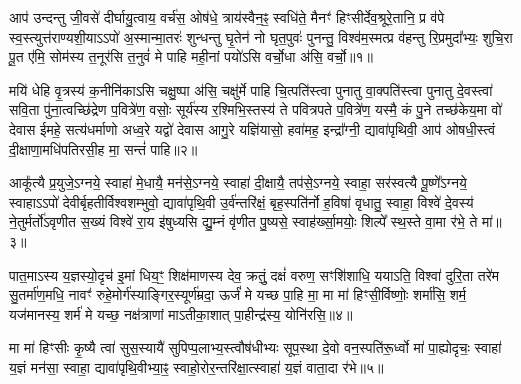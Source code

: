 {\anuvakamend[{जु॒षेथा॒मा स नो॑ यजा॒दा त्रयो॑विꣳशतिश्च}]}

{\prashnaend[{इ॒षे त्वा॑ य॒ज्ञस्य॒ शुन्ध॑ध्वं॒ कर्म॑णे दे॒वो\-ऽव॑धूत॒न्धृष्टिः॒ सं व॑पा॒म्या द॑दे॒
प्रत्यु॑ष्टं॒ कृष्णो॑\-ऽसि॒ भुव॑नमसि॒ वाज॑स्यो॒भा वां॒ चतु॑र्दश॥14॥ इ॒षे दृꣳ॑ह॒ भुव॑नम॒ष्टाविꣳ॑शतिः॥28॥ इ॒षे त्वा॑ क॒ल्पया॑ति॥}]}


\setcounter{anuvakam}{0}
आप॑ उन्दन्तु जी॒वसे॑ दीर्घायु॒त्वाय॒ वर्च॑स॒ ओष॑धे॒ त्राय॑स्वैन॒ꣴ॒ स्वधि॑ते॒ मैनꣳ॑ हिꣳसीर्देव॒श्रूरे॒तानि॒ प्र व॑पे स्व॒स्त्युत्त॑राण्यशी॒या\-ऽ\-ऽपो॑ अ॒स्मान्मा॒तरः॑ शुन्धन्तु घृ॒तेन॑ नो घृत॒पुवः॑ पुनन्तु॒ विश्व॑म॒स्मत्प्र व॑हन्तु रि॒प्रमुदा᳚भ्यः॒ शुचि॒रा पू॒त ए॑मि॒ सोम॑स्य त॒नूर॑सि त॒नुवं॑ मे पाहि मही॒नां पयो॑\-ऽसि वर्चो॒धा अ॑सि॒ वर्चो॒॥१॥

मयि॑ धेहि वृ॒त्रस्य॑ क॒नीनि॑का\-ऽसि चक्षु॒ष्पा अ॑सि॒ चक्षु॑र्मे पाहि चि॒त्पति॑स्त्वा पुनातु वा॒क्पति॑स्त्वा पुनातु दे॒वस्त्वा॑ सवि॒ता पु॑ना॒त्वच्छि॑द्रेण प॒वित्रे॑ण॒ वसोः॒ सूर्य॑स्य र॒श्मिभि॒स्तस्य॑ ते पवित्रपते प॒वित्रे॑ण॒ यस्मै॒ कं पु॒ने तच्छ॑केय॒मा वो॑ देवास ईमहे॒ सत्य॑धर्माणो अध्व॒रे यद्वो॑ देवास आगु॒रे यज्ञि॑यासो॒ हवा॑मह॒ इन्द्रा᳚ग्नी॒ द्यावा॑पृथिवी॒ आप॑ ओषधी॒स्त्वं दी॒क्षाणा॒मधि॑पतिरसी॒ह मा॒ सन्तं॑ पाहि॥२॥

{\anuvakamend[{वर्च॑ ओषधीर॒ष्टौ च॑॥१॥}]}

आकू᳚त्यै प्र॒युजे॒\-ऽग्नये॒ स्वाहा॑ मे॒धायै॒ मन॑से॒\-ऽग्नये॒ स्वाहा॑ दी॒क्षायै॒ तप॑से॒\-ऽग्नये॒ स्वाहा॒ सर॑स्वत्यै पू॒ष्णे᳚\-ऽग्नये॒ स्वाहा\-ऽ\-ऽपो॑ देवीर्बृहतीर्विश्वशम्भुवो॒ द्यावा॑पृथि॒वी उ॒र्व॑न्तरि॑क्षं॒ बृह॒स्पति॑र्नो ह॒विषा॑ वृधातु॒ स्वाहा॒ विश्वे॑ दे॒वस्य॑ ने॒तुर्मर्तो॑\-ऽवृणीत स॒ख्यं विश्वे॑ रा॒य इ॑षुध्यसि द्यु॒म्नं वृ॑णीत पु॒ष्यसे॒ स्वाह॑र्ख्सा॒मयोः॒ शिल्पे᳚ स्थ॒स्ते वा॒मा र॑भे॒ ते मा॑॥३॥

पात॒मा\-ऽस्य य॒ज्ञस्यो॒दृच॑ इ॒मां धिय॒ꣳ॒ शिक्ष॑माणस्य देव॒ क्रतुं॒ दक्षं॑ वरुण॒ सꣳशि॑शाधि॒ यया\-ऽति॒ विश्वा॑ दुरि॒ता तरे॑म सु॒तर्मा॑ण॒मधि॒ नावꣳ॑ रुहे॒मोर्ग॑स्याङ्गिर॒स्यूर्ण॑म्रदा॒ ऊर्जं॑ मे यच्छ पा॒हि मा॒ मा मा॑ हिꣳसी॒र्विष्णोः॒ शर्मा॑सि॒ शर्म॒ यज॑मानस्य॒ शर्म॑ मे यच्छ॒ नक्ष॑त्राणां मा\-ऽतीका॒शात् पा॒हीन्द्र॑स्य॒ योनि॑रसि॒॥४॥

मा मा॑ हिꣳसीः कृ॒ष्यै त्वा॑ सुस॒स्यायै॑ सुपिप्प॒लाभ्य॒स्त्वौष॑\-धीभ्यः सूप॒स्था दे॒वो वन॒स्पति॑रू॒र्ध्वो मा॑ पा॒ह्योदृचः॒ स्वाहा॑ य॒ज्ञं मन॑सा॒ स्वाहा॒ द्यावा॑पृथि॒वीभ्या॒ꣴ॒ स्वाहो॒रोर॒न्तरि॑क्षा॒त्स्वाहा॑ य॒ज्ञं वाता॒दा र॑भे॥५॥

